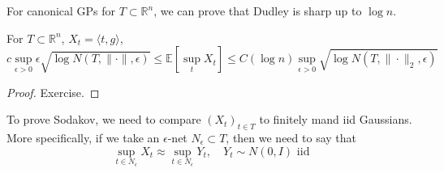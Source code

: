	\begin{example}
		For canonical GPs for $T \subset \mathbb{R}^n$, we can prove that Dudley is sharp up to $\log{n}$. 
	\end{example}

	\begin{theorem}
		For $T \subset \mathbb{R}^n$, $X_t = \langle t, g \rangle$, 
		\begin{equation}
			c \sup_{\epsilon > 0} \epsilon \sqrt{\log{N(T, \|\cdot\|, \epsilon)}} \leq \mathbb{E}[\sup_t X_t] \leq C (\log{n}) \sup_{\epsilon > 0} \sqrt{\log{N(T, \|\cdot\|_2, \epsilon)}}
		\end{equation} 
	\end{theorem}
	\begin{proof}
	  Exercise.
	\end{proof}

	To prove Sodakov, we need to compare $(X_t)_{t \in T}$ to finitely mand iid Gaussians. More specifically, if we take an $\epsilon$-net $N_{\epsilon} \subset T$, then we need to say that 
	\begin{equation}
		\sup_{t \in N_\epsilon} X_t \approx \sup_{t \in N_\epsilon} Y_t, \quad Y_t \sim N(0, I) \text{ iid}
	\end{equation}


